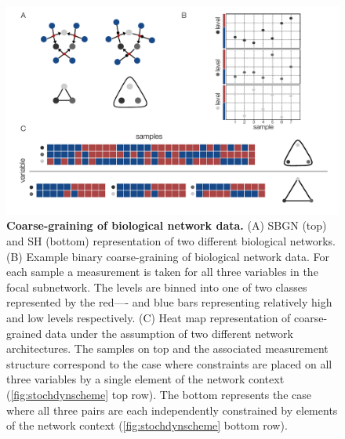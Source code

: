 \begin{figure}[!ht]
\centering
\noindent\includegraphics[width=0.9\columnwidth]{fig/figure_expression_concept.pdf}
\caption{{\bf Coarse-graining of biological network data.} (A) SBGN (top) and SH (bottom) representation of two different biological networks. (B) Example binary coarse-graining of biological network data. For each sample a measurement is taken for all three variables in the focal subnetwork. The levels are binned into one of two classes represented by the red---- and blue bars representing relatively high and low levels respectively. (C) Heat map representation of coarse-grained data under the assumption of two different network architectures. The samples on top and the associated measurement structure correspond to the case where constraints are placed on all three variables by a single element of the network context (\ref{fig:stochdynscheme} top row). The bottom represents the case where all three pairs are each independently constrained by elements of the network context (\ref{fig:stochdynscheme} bottom row).}
\label{fig:expression_concept}
\end{figure}

